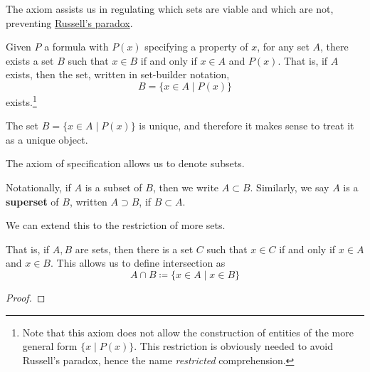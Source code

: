  The axiom assists us in regulating which sets are viable and which are not, preventing \hyperref[thm:russells-paradox]{Russell's paradox}. 

  \begin{axiom}
    \label{thm:axiom-schema-of-restricted-comprehension}
    Given $P$ a formula with $P(x)$ specifying a property of $x$, for any set $A$, there exists a set $B$ such that $x \in B$ if and only if $x \in A$ and $P(x)$. That is, if $A$ exists, then the set, written in set-builder notation, 
    \begin{equation}
      B = \{x \in A \mid P(x) \}
    \end{equation}
    exists.\footnote{Note that this axiom does not allow the construction of entities of the more general form $\{x \mid P(x)\}$. This restriction is obviously needed to avoid Russell's paradox, hence the name \textit{restricted} comprehension. } 
  \end{axiom} 

  \begin{lemma}
    \label{thm:uniqueness-of-restricted-comprehension}
    The set $B = \{x \in A \mid P(x) \}$ is unique, and therefore it makes sense to treat it as a unique object. 
  \end{lemma}

  The axiom of specification allows us to denote subsets. 

  \begin{definition}
    \label{def:subset-superset}
    Notationally, if $A$ is a subset of $B$, then we write $A \subset B$. Similarly, we say $A$ is a \textbf{superset} of $B$, written $A \supset B$, if $B \subset A$. 
  \end{definition} 

  We can extend this to the restriction of more sets. 

  \begin{theorem}
    \label{thm:existence-of-binary-intersection}
    That is, if $A, B$ are sets, then there is a set $C$ such that $x \in C$ if and only if $x \in A$ and $x \in B$. This allows us to define intersection as 
    \begin{equation}
      A \cap B \coloneqq \{x \in A \mid x \in B \}
    \end{equation} 
  \end{theorem} 
  \begin{proof}
    
  \end{proof} 

